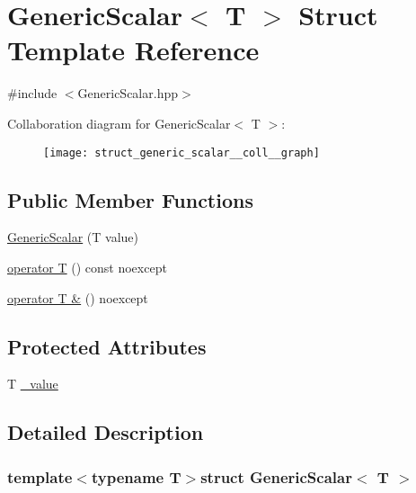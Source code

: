 \hypertarget{struct_generic_scalar}{\section{Generic\-Scalar$<$ T $>$ Struct Template Reference}
\label{struct_generic_scalar}
}


{\ttfamily \#include $<$Generic\-Scalar.\-hpp$>$}



Collaboration diagram for Generic\-Scalar$<$ T $>$\-:
\nopagebreak
\begin{figure}[H]
\begin{center}
\leavevmode
\texttt{[image: struct\_generic\_scalar\_\_coll\_\_graph]}
\end{center}
\end{figure}
\subsection*{Public Member Functions}
\begin{DoxyCompactItemize}
\item 
\hyperlink{struct_generic_scalar_aaabb6f012a3d829348c318e14b6dc551}{Generic\-Scalar} (T value)
\item 
\hyperlink{struct_generic_scalar_ae1346acd021b8f259e58723350d26729}{operator T} () const noexcept
\item 
\hyperlink{struct_generic_scalar_a4d146d4dce6f936e42211a6528cc9775}{operator T \&} () noexcept
\end{DoxyCompactItemize}
\subsection*{Protected Attributes}
\begin{DoxyCompactItemize}
\item 
T \hyperlink{struct_generic_scalar_a27d311e2bdb13149160fa258d46bcfe3}{\-\_\-value}
\end{DoxyCompactItemize}


\subsection{Detailed Description}
\subsubsection*{template$<$typename T$>$struct Generic\-Scalar$<$ T $>$}

